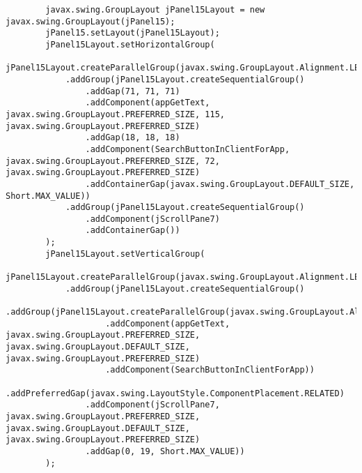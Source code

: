 \documentclass[12pt,a4paper]{article}
\begin{document}
\begin{lstlisting}
        javax.swing.GroupLayout jPanel15Layout = new javax.swing.GroupLayout(jPanel15);
        jPanel15.setLayout(jPanel15Layout);
        jPanel15Layout.setHorizontalGroup(
            jPanel15Layout.createParallelGroup(javax.swing.GroupLayout.Alignment.LEADING)
            .addGroup(jPanel15Layout.createSequentialGroup()
                .addGap(71, 71, 71)
                .addComponent(appGetText, javax.swing.GroupLayout.PREFERRED_SIZE, 115, javax.swing.GroupLayout.PREFERRED_SIZE)
                .addGap(18, 18, 18)
                .addComponent(SearchButtonInClientForApp, javax.swing.GroupLayout.PREFERRED_SIZE, 72, javax.swing.GroupLayout.PREFERRED_SIZE)
                .addContainerGap(javax.swing.GroupLayout.DEFAULT_SIZE, Short.MAX_VALUE))
            .addGroup(jPanel15Layout.createSequentialGroup()
                .addComponent(jScrollPane7)
                .addContainerGap())
        );
        jPanel15Layout.setVerticalGroup(
            jPanel15Layout.createParallelGroup(javax.swing.GroupLayout.Alignment.LEADING)
            .addGroup(jPanel15Layout.createSequentialGroup()
                .addGroup(jPanel15Layout.createParallelGroup(javax.swing.GroupLayout.Alignment.BASELINE)
                    .addComponent(appGetText, javax.swing.GroupLayout.PREFERRED_SIZE, javax.swing.GroupLayout.DEFAULT_SIZE, javax.swing.GroupLayout.PREFERRED_SIZE)
                    .addComponent(SearchButtonInClientForApp))
                .addPreferredGap(javax.swing.LayoutStyle.ComponentPlacement.RELATED)
                .addComponent(jScrollPane7, javax.swing.GroupLayout.PREFERRED_SIZE, javax.swing.GroupLayout.DEFAULT_SIZE, javax.swing.GroupLayout.PREFERRED_SIZE)
                .addGap(0, 19, Short.MAX_VALUE))
        );


\end{lstlisting}
\end{document}
